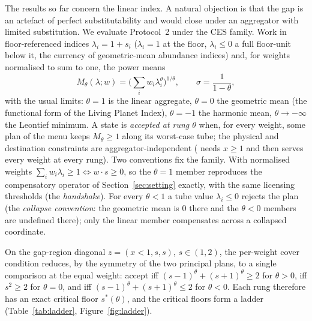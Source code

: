 The results so far concern the linear index. A natural objection is that the gap is an artefact of perfect substitutability and would close under an aggregator with limited substitution. We evaluate Protocol~2 under the CES family. Work in floor-referenced indices $\lambda_i=1+s_i$ ($\lambda_i=1$ at the floor, $\lambda_i\le0$ a full floor-unit below it, the currency of geometric-mean abundance indices) and, for weights normalised to sum to one, the power means
\[
M_\theta(\lambda;w)=\Big(\sum_iw_i\lambda_i^\theta\Big)^{1/\theta},\qquad\sigma=\frac1{1-\theta},
\]
with the usual limits: $\theta=1$ is the linear aggregate, $\theta=0$ the geometric mean (the functional form of the Living Planet Index), $\theta=-1$ the harmonic mean, $\theta\to-\infty$ the Leontief minimum. A state is \emph{accepted at rung $\theta$} when, for every weight, some plan of the menu keeps $M_\theta\ge1$ along its worst-case tube; the physical and destination constraints are aggregator-independent ( needs $x\ge1$ and then serves every weight at every rung). Two conventions fix the family. With normalised weights $\sum_iw_i\lambda_i\ge1\iff w\cdot s\ge0$, so the $\theta=1$ member reproduces the compensatory operator of Section~\ref{sec:setting} exactly, with the same licensing thresholds (the \emph{handshake}). For every $\theta<1$ a tube value $\lambda_i\le0$ rejects the plan (the \emph{collapse convention}: the geometric mean is $0$ there and the $\theta<0$ members are undefined there); only the linear member compensates across a collapsed coordinate.

On the gap-region diagonal $z=(x<1,s,s)$, $s\in(1,2)$, the per-weight cover condition reduces, by the symmetry of the two principal plans, to a single comparison at the equal weight: accept iff $(s-1)^\theta+(s+1)^\theta\ge2$ for $\theta>0$, iff $s^2\ge2$ for $\theta=0$, and iff $(s-1)^\theta+(s+1)^\theta\le2$ for $\theta<0$. Each rung therefore has an exact critical floor $s^*(\theta)$, and the critical floors form a ladder (Table~\ref{tab:ladder}, Figure~\ref{fig:ladder}).

